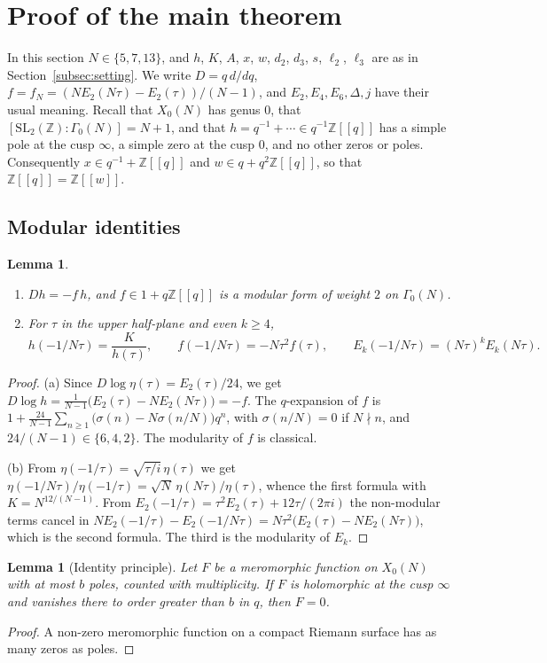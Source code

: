 \documentclass[11pt,a4paper]{article}
\newtheorem{lemma}[theorem]{Lemma}
\theoremstyle{definition}
\theoremstyle{remark}
\newcommand{\Z}{\mathbb{Z}}
\numberwithin{equation}{section}
\begin{document}
\section{Proof of the main theorem}\label{sec:proof}

In this section $N\in\{5,7,13\}$, and $h$, $K$, $A$, $x$, $w$, $d_2$, $d_3$,
$s$, $\ell_2$, $\ell_3$ are as in Section~\ref{subsec:setting}. We write
$D=q\,d/dq$, $f=f_N=(NE_2(N\tau)-E_2(\tau))/(N-1)$, and $E_2,E_4,E_6,\Delta,j$
have their usual meaning. Recall that $X_0(N)$ has genus $0$, that
$[\mathrm{SL}_2(\Z):\Gamma_0(N)]=N+1$, and that $h=q^{-1}+\cdots\in q^{-1}\Z[[q]]$
has a simple pole at the cusp $\infty$, a simple zero at the cusp $0$, and no
other zeros or poles. Consequently $x\in q^{-1}+\Z[[q]]$ and
$w\in q+q^2\Z[[q]]$, so that $\Z[[q]]=\Z[[w]]$.

\subsection{Modular identities}

\begin{lemma}\label{lem:basic}
\begin{enumerate}
\item[(a)] $Dh=-f\,h$, and $f\in1+q\Z[[q]]$ is a modular form of weight $2$ on
$\Gamma_0(N)$.
\item[(b)] For $\tau$ in the upper half-plane and even $k\ge4$,
\[
h(-1/N\tau)=\frac{K}{h(\tau)},\qquad f(-1/N\tau)=-N\tau^2f(\tau),\qquad
E_k(-1/N\tau)=(N\tau)^kE_k(N\tau).
\]
\end{enumerate}
\end{lemma}
\begin{proof}
(a) Since $D\log\eta(\tau)=E_2(\tau)/24$, we get
$D\log h=\frac{1}{N-1}\bigl(E_2(\tau)-NE_2(N\tau)\bigr)=-f$. The $q$-expansion
of $f$ is $1+\frac{24}{N-1}\sum_{n\ge1}\bigl(\sigma(n)-N\sigma(n/N)\bigr)q^n$,
with $\sigma(n/N)=0$ if $N\nmid n$, and $24/(N-1)\in\{6,4,2\}$. The modularity
of $f$ is classical.

(b) From $\eta(-1/\tau)=\sqrt{\tau/i}\,\eta(\tau)$ we get
$\eta(-1/N\tau)/\eta(-1/\tau)=\sqrt N\,\eta(N\tau)/\eta(\tau)$, whence the
first formula with $K=N^{12/(N-1)}$. From
$E_2(-1/\tau)=\tau^2E_2(\tau)+12\tau/(2\pi i)$ the non-modular terms cancel in
$NE_2(-1/\tau)-E_2(-1/N\tau)=N\tau^2\bigl(E_2(\tau)-NE_2(N\tau)\bigr)$, which
is the second formula. The third is the modularity of $E_k$.
\end{proof}

\begin{lemma}[Identity principle]\label{lem:principle}
Let $F$ be a meromorphic function on $X_0(N)$ with at most $b$ poles, counted
with multiplicity. If $F$ is holomorphic at the cusp $\infty$ and vanishes
there to order greater than $b$ in $q$, then $F=0$.
\end{lemma}
\begin{proof}
A non-zero meromorphic function on a compact Riemann surface has as many
zeros as poles.
\end{proof}
\end{document}
